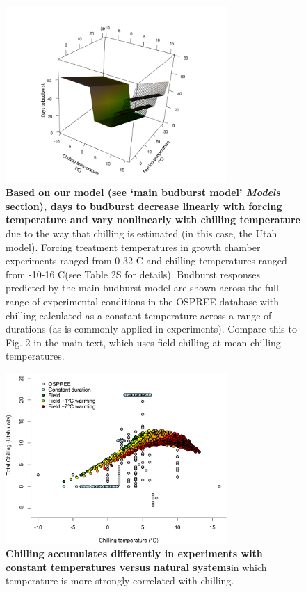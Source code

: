 \documentclass{article}
\begin{document}
\begin{figure}[h!]
\centering
\noindent \includegraphics[width=0.75\textwidth]{..//..//analyses/bb_analysis/figures/bbmod_3dplot_utah.png}
\caption{\textbf{Based on our model (see `main budburst model' \emph{Models} section), days to budburst decrease linearly with forcing temperature and vary nonlinearly with chilling temperature} due to the way that chilling is estimated (in this case, the Utah model). Forcing treatment temperatures in growth chamber experiments ranged from 0-32 \degree C and chilling temperatures ranged from -10-16 \degree C(see Table 2S for details). Budburst responses predicted by the main budburst model are shown across the full range of experimental conditions in the OSPREE database with chilling calculated as a constant temperature across a range of durations (as  is commonly applied in experiments). Compare this to Fig. 2 in the main text, which uses field chilling at mean chilling temperatures. }
\label{fig:3dexpchillutah}
\end{figure}

\begin{figure}[h!]
\centering
\noindent \includegraphics[width=0.75\textwidth]{..//..//analyses/bb_analysis/figures/exp_vs_field_chill_withwarmingcols.png}
\caption{\textbf{Chilling accumulates differently in experiments with constant temperatures versus natural systems}in which temperature is more strongly correlated with chilling.}
\label{fig:chillexpfield}
\end{figure}
\end{document}
